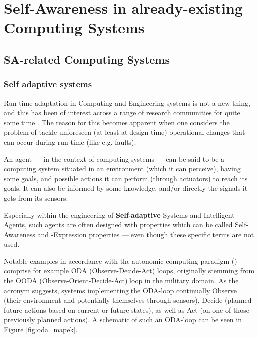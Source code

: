 \section{Self-Awareness in already-existing Computing Systems}

	\subsection{SA-related Computing Systems}
	
		\subsubsection{Self adaptive systems}
		Run-time adaptation in Computing and Engineering systems is not a new thing, and this has been of interest across a range of research communities for quite some time \cite{sacs16_ch4}. The reason for this becomes apparent when one considers the problem of tackle unforeseen (at least at design-time) operational changes that can occur during run-time (like e.g. faults).

		An agent — in the context of computing systems — can be said to be a computing system situated in an environment (which it can perceive), having some goals, and possible actions it can perform (through actuators) to reach its goals. It can also be informed by some knowledge, and/or directly the signals it gets from its sensors.

		Especially within the engineering of \textbf{Self-adaptive} Systems and Intelligent Agents, such agents are often designed with properties which can be called Self-Awareness and -Expression properties — even though these specific terms are not used.

		Notable examples in accordance with the autonomic computing paradigm (\cite{sacs16_ch4}) comprise for example ODA (Observe-Decide-Act) loops, originally stemming from the OODA (Observe-Orient-Decide-Act) loop in the military domain. As the acronym suggests, systems implementing the ODA-loop continually Observe (their environment and potentially themselves through sensors), Decide (planned future actions based on current or future states), as well as Act (on one of those previously planned actions). A schematic of such an ODA-loop can be seen in Figure \ref{fig:oda_mapek}.

